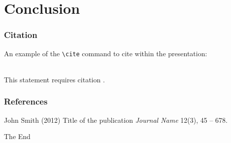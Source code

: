\documentclass{beamer}
\begin{document}





\section{Conclusion}














\begin{frame}[fragile] %
\frametitle{Citation}
An example of the \verb|\cite| command to cite within the presentation:\\~

This statement requires citation \cite{p1}.
\end{frame}


\begin{frame}
\frametitle{References}
\footnotesize{
\begin{thebibliography}{99} %
 John Smith (2012)
\newblock Title of the publication
\newblock \emph{Journal Name} 12(3), 45 -- 678.
\end{thebibliography}
}
\end{frame}


\begin{frame}
\Huge{\centerline{The End}}
\end{frame}

\end{document}
